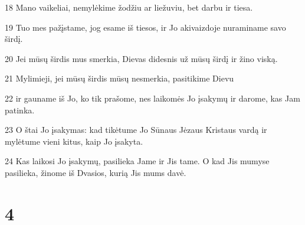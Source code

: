 \par 18 Mano vaikeliai, nemylėkime žodžiu ar liežuviu, bet darbu ir tiesa. 
\par 19 Tuo mes pažįstame, jog esame iš tiesos, ir Jo akivaizdoje nuraminame savo širdį. 
\par 20 Jei mūsų širdis mus smerkia, Dievas didesnis už mūsų širdį ir žino viską. 
\par 21 Mylimieji, jei mūsų širdis mūsų nesmerkia, pasitikime Dievu 
\par 22 ir gauname iš Jo, ko tik prašome, nes laikomės Jo įsakymų ir darome, kas Jam patinka. 
\par 23 O štai Jo įsakymas: kad tikėtume Jo Sūnaus Jėzaus Kristaus vardą ir mylėtume vieni kitus, kaip Jo įsakyta. 
\par 24 Kas laikosi Jo įsakymų, pasilieka Jame ir Jis tame. O kad Jis mumyse pasilieka, žinome iš Dvasios, kurią Jis mums davė.


\chapter{4}


